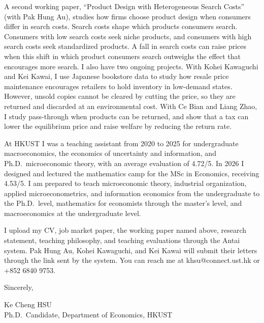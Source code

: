 \documentclass[11pt]{article}
\begin{document}
A second working paper, ``Product Design with Heterogeneous Search Costs'' (with Pak Hung Au), studies how firms choose product design when consumers differ in search costs. Search costs shape which products consumers search. Consumers with low search costs seek niche products, and consumers with high search costs seek standardized products. A fall in search costs can raise prices when this shift in which product consumers search outweighs the effect that encourages more search. I also have two ongoing projects. With Kohei Kawaguchi and Kei Kawai, I use Japanese bookstore data to study how resale price maintenance encourages retailers to hold inventory in low-demand states. However, unsold copies cannot be cleared by cutting the price, so they are returned and discarded at an environmental cost. With Ce Bian and Liang Zhao, I study pass-through when products can be returned, and show that a tax can lower the equilibrium price and raise welfare by reducing the return rate.

At HKUST I was a teaching assistant from 2020 to 2025 for undergraduate macroeconomics, the economics of uncertainty and information, and Ph.D.\ microeconomic theory, with an average evaluation of 4.72/5. In 2026 I designed and lectured the mathematics camp for the MSc in Economics, receiving 4.53/5. I am prepared to teach microeconomic theory, industrial organization, applied microeconometrics, and information economics from the undergraduate to the Ph.D.\ level, mathematics for economists through the master's level, and macroeconomics at the undergraduate level.

I upload my CV, job market paper, the working paper named above, research statement, teaching philosophy, and teaching evaluations through the Antai system. Pak Hung Au, Kohei Kawaguchi, and Kei Kawai will submit their letters through the link sent by the system. You can reach me at khsu@connect.ust.hk or +852 6840 9753.

\vspace{0.35em}
Sincerely,

\vspace{0.35em}
Ke Cheng HSU \\
Ph.D.\ Candidate, Department of Economics, HKUST
\end{document}
